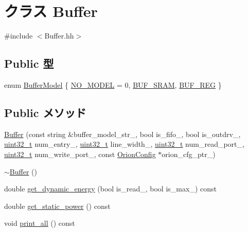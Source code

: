 \hypertarget{classBuffer}{
\section{クラス Buffer}
\label{classBuffer}
}


{\ttfamily \#include $<$Buffer.hh$>$}\subsection*{Public 型}
\begin{DoxyCompactItemize}
\item 
enum \hyperlink{classBuffer_aaa1b52e516aa86db344256019b904840}{BufferModel} \{ \hyperlink{classBuffer_aaa1b52e516aa86db344256019b904840abab57b6e2c553e4d983f415a1f4ea75b}{NO\_\-MODEL} =  0, 
\hyperlink{classBuffer_aaa1b52e516aa86db344256019b904840a99a4e26934946b15bde8d5e6311ff98e}{BUF\_\-SRAM}, 
\hyperlink{classBuffer_aaa1b52e516aa86db344256019b904840aebafedb9a04e73c117cce7cebbf53790}{BUF\_\-REG}
 \}
\end{DoxyCompactItemize}
\subsection*{Public メソッド}
\begin{DoxyCompactItemize}
\item 
\hyperlink{classBuffer_a2aaebb88cefd77cf975f76e3f0f6a88d}{Buffer} (const string \&buffer\_\-model\_\-str\_\-, bool is\_\-fifo\_\-, bool is\_\-outdrv\_\-, \hyperlink{Type_8hh_a435d1572bf3f880d55459d9805097f62}{uint32\_\-t} num\_\-entry\_\-, \hyperlink{Type_8hh_a435d1572bf3f880d55459d9805097f62}{uint32\_\-t} line\_\-width\_\-, \hyperlink{Type_8hh_a435d1572bf3f880d55459d9805097f62}{uint32\_\-t} num\_\-read\_\-port\_\-, \hyperlink{Type_8hh_a435d1572bf3f880d55459d9805097f62}{uint32\_\-t} num\_\-write\_\-port\_\-, const \hyperlink{classOrionConfig}{OrionConfig} $\ast$orion\_\-cfg\_\-ptr\_\-)
\item 
\hyperlink{classBuffer_ac72b418d40e29411ac044a49a20be750}{$\sim$Buffer} ()
\item 
double \hyperlink{classBuffer_a10fb66546e1cf164fe736f85adc39a63}{get\_\-dynamic\_\-energy} (bool is\_\-read\_\-, bool is\_\-max\_\-) const 
\item 
double \hyperlink{classBuffer_aeb5933543cfdeb1668baed5ce7c68351}{get\_\-static\_\-power} () const 
\item 
void \hyperlink{classBuffer_a8404831790e4809674f0249ef6505cd5}{print\_\-all} () const 
\end{DoxyCompactItemize}
